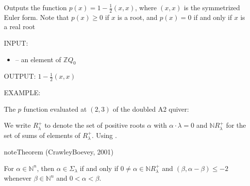 \documentclass[letterpaper,10pt,english]{sphinxmanual}
\begin{document}
\begin{fulllineitems}
\label{\detokenize{index:quivercombinatorics.quivercombinatorics.Quiver.p_function}}
\pysigstartsignatures
\pysiglinewithargsret
{}
{}
{}
\pysigstopsignatures
\sphinxAtStartPar
Outputs the function \(p(x) = 1 - \frac{1}{2}(x, x)\), where \((x, x)\) is the symmetrized Euler form. Note that \(p(x)\geq 0\) if \(x\) is a root, and \(p(x) = 0\) if and only if \(x\) is a real root

\sphinxAtStartPar
INPUT:
\begin{itemize}
\item {} 
\sphinxAtStartPar
{} – an element of \(\mathbb{Z}Q_0\)

\end{itemize}

\sphinxAtStartPar
OUTPUT: \(1 - \frac{1}{2}(x, x)\)

\sphinxAtStartPar
EXAMPLE:

\sphinxAtStartPar
The \(p\) function evaluated at \((2, 3)\) of the doubled A2 quiver:

\begin{sphinxVerbatim}[commandchars=\\\{\}]
  
   \PYG{p}{[}\PYG{p}{[} \PYG{p}{]} \PYG{p}{[} \PYG{p}{]}\PYG{p}{]}
  
\end{sphinxVerbatim}

\end{fulllineitems}


\sphinxAtStartPar
We write \(R_\lambda^+\) to denote the set of positive roots \(\alpha\) with \(\alpha\cdot\lambda=0\) and \(\mathbb{N}R_\lambda^+\) for the set of sums of elements of \(R_\lambda^+\). Using .

\begin{sphinxadmonition}{note}{Theorem (Crawley\sphinxhyphen{}Boevey, 2001)}

\sphinxAtStartPar
For \(\alpha\in\mathbb{N}^n\), then \(\alpha\in\Sigma_\lambda\) if and only if \(0\neq\alpha\in\mathbb{N}R_\lambda^+\) and \((\beta,\alpha-\beta)\leq -2\) whenever \(\beta\in\mathbb{N}^n\) and \(0<\alpha<\beta\).
\end{sphinxadmonition}
\end{document}
